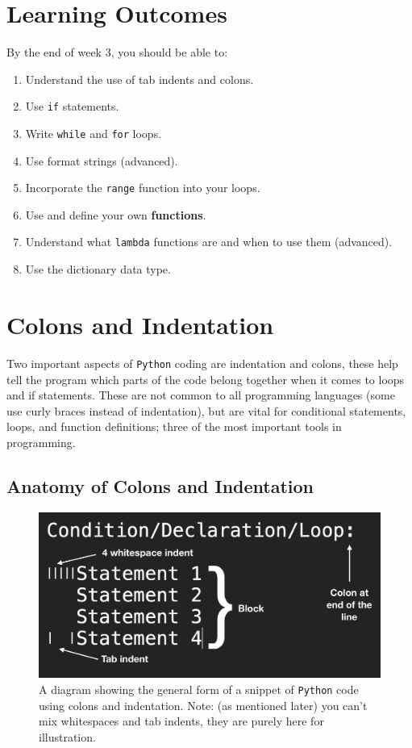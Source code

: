 \section{Learning Outcomes}

By the end of week 3, you should be able to:

\begin{enumerate}
\item Understand the use of tab indents and colons.
\item Use {\tt if} statements.
\item Write {\tt while} and {\tt for} loops.
\item Use format strings (advanced).
\item Incorporate the {\tt range} function into your loops.
\item Use and define your own {\bf functions}.
\item Understand what {\tt lambda} functions are and when to use them (advanced).
\item Use the dictionary data type.

\end{enumerate}

\section{Colons and Indentation}

\label{indents}

\noindent Two important aspects of \texttt{Python} coding are indentation and colons, these help tell the program which parts of the code belong together when it comes to loops and if statements. These are not common to all programming languages (some use curly braces instead of indentation), but are vital for conditional statements, loops, and function definitions; three of the most important tools in programming.

\subsection*{Anatomy of Colons and Indentation}
\begin{figure}[H]  
\centering
\includegraphics[width=0.7\linewidth]{Figures/anatomyOfColonindent.png}
\caption{A diagram showing the general form of a snippet of \texttt{Python} code using colons and indentation. Note: (as mentioned later) you can't mix whitespaces and tab indents, they are purely here for illustration.} 
\label{fig:colindt}
\end{figure}

